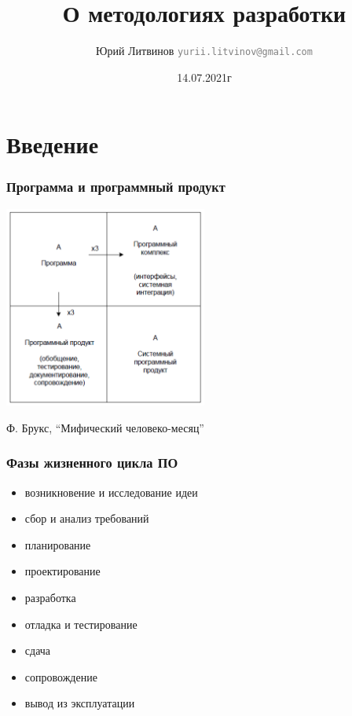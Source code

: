 \documentclass[xetex,mathserif,serif]{beamer}
\title{О методологиях разработки}
\author[Юрий Литвинов]{Юрий Литвинов \newline \textcolor{gray}{\small\texttt{yurii.litvinov@gmail.com}}}
\date{14.07.2021г}
\begin{document}
    
    \frame{\titlepage}

    \section{Введение}
    
    \begin{frame}
        \frametitle{Программа и программный продукт}
        \begin{center}
            \includegraphics[width=0.5\textwidth]{mythical-man-month.png}
        \end{center}
        \begin{center}
            Ф. Брукс, ``Мифический человеко-месяц''
        \end{center}
    \end{frame}

    \begin{frame}
        \frametitle{Фазы жизненного цикла ПО}
        \begin{itemize}
            \item возникновение и исследование идеи
            \item сбор и анализ требований
            \item планирование 
            \item проектирование
            \item разработка
            \item отладка и тестирование
            \item сдача
            \item сопровождение
            \item вывод из эксплуатации
        \end{itemize}
    \end{frame}
\end{document}
